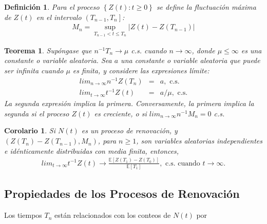 \documentclass{article}
\newtheorem{Def}{Definición}
\newtheorem{Teo}{Teorema}
\newtheorem{Coro}{Corolario}
\newcommand{\esp}{\mathbb{E}}
\begin{document}
\begin{Def}
Para el proceso $\left\{Z\left(t\right):t\geq0\right\}$ se define la fluctuaci\'on m\'axima de $Z\left(t\right)$ en el intervalo $\left(T_{n-1},T_{n}\right]$:
\begin{eqnarray*}
M_{n}=\sup_{T_{n-1}<t\leq T_{n}}|Z\left(t\right)-Z\left(T_{n-1}\right)|
\end{eqnarray*}
\end{Def}

\begin{Teo}
Sup\'ongase que $n^{-1}T_{n}\rightarrow\mu$ c.s. cuando $n\rightarrow\infty$, donde $\mu\leq\infty$ es una constante o variable aleatoria. Sea $a$ una constante o variable aleatoria que puede ser infinita cuando $\mu$ es finita, y considere las expresiones l\'imite:
\begin{eqnarray}
lim_{n\rightarrow\infty}n^{-1}Z\left(T_{n}\right)&=&a,\textrm{ c.s.}\\
lim_{t\rightarrow\infty}t^{-1}Z\left(t\right)&=&a/\mu,\textrm{ c.s.}
\end{eqnarray}
La segunda expresi\'on implica la primera. Conversamente, la primera implica la segunda si el proceso $Z\left(t\right)$ es creciente, o si $lim_{n\rightarrow\infty}n^{-1}M_{n}=0$ c.s.
\end{Teo}

\begin{Coro}
Si $N\left(t\right)$ es un proceso de renovaci\'on, y $\left(Z\left(T_{n}\right)-Z\left(T_{n-1}\right),M_{n}\right)$, para $n\geq1$, son variables aleatorias independientes e id\'enticamente distribuidas con media finita, entonces,
\begin{eqnarray}
lim_{t\rightarrow\infty}t^{-1}Z\left(t\right)\rightarrow\frac{\esp\left[Z\left(T_{1}\right)-Z\left(T_{0}\right)\right]}{\esp\left[T_{1}\right]},\textrm{ c.s. cuando  }t\rightarrow\infty.
\end{eqnarray}
\end{Coro}

%
\subsection{Propiedades de los Procesos de Renovaci\'on}
%

Los tiempos $T_{n}$ est\'an relacionados con los conteos de $N\left(t\right)$ por
\end{document}
